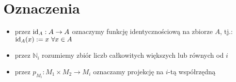 \section{Oznaczenia}
\begin{itemize}
  \item przez $\operatorname{id}_A: A \rightarrow A$ oznaczymy funkcję identycznościową na zbiorze $A$, tj.: $\operatorname{id}_A(x) := x\ \forall x \in A$
  \item przez $\mathbb{N}_i$  rozumiemy zbiór liczb całkowitych większych lub równych od $i$
  \item przez $p_{M_i}: M_1 \times M_2 \rightarrow M_i$ oznaczamy projekcję na $i$-tą współrzędną
\end{itemize}